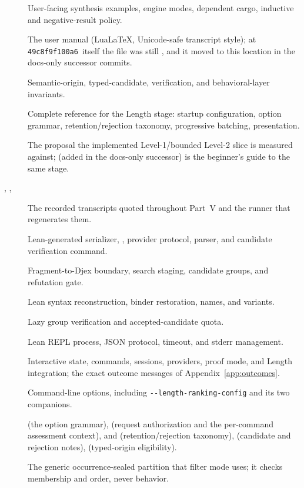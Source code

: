 \documentclass[10pt,letterpaper,oneside,openany]{report}
\newcommand{\term}[1]{\texttt{\detokenize{#1}}}
\newcommand{\LeantCommit}{\texttt{49c8f9f100a6}}
\begin{document}
\begin{description}
\item[] User-facing synthesis examples, engine modes, dependent cargo, inductive and negative-result policy.
\item[] The user manual (LuaLaTeX, Unicode-safe transcript style); at \LeantCommit\ itself the file was still , and it moved to this location in the docs-only successor commits.
\item[] Semantic-origin, typed-candidate, verification, and behavioral-layer invariants.
\item[] Complete reference for the Length stage: startup configuration, \term{:synth} option grammar, retention/rejection taxonomy, progressive batching, presentation.
\item[] The proposal the implemented Level-1/bounded Level-2 slice is measured against;  (added in the docs-only successor) is the beginner's guide to the same stage.
\item[, , ] The recorded \term{:synth} transcripts quoted throughout Part~V and the runner that regenerates them.
\item[] Lean-generated serializer, \term{Frag}, provider protocol, parser, and candidate verification command.
\item[] Fragment-to-Djex boundary, search staging, candidate groups, and refutation gate.
\item[] Lean syntax reconstruction, binder restoration, names, and variants.
\item[] Lazy group verification and accepted-candidate quota.
\item[] Lean REPL process, JSON protocol, timeout, and stderr management.
\item[] Interactive state, commands, sessions, providers, proof mode, and Length integration; the exact outcome messages of Appendix~\ref{app:outcomes}.
\item[] Command-line options, including \texttt{-\kern0pt-length-ranking-config} and its two companions.
\item[]  (the \term{:synth} option grammar),  (request authorization and the per-command assessment context),  and  (retention/rejection taxonomy),  (candidate and rejection notes),  (typed-origin eligibility).
\item[] The generic occurrence-sealed partition that filter mode uses; it checks membership and order, never behavior.
\end{description}
\end{document}

